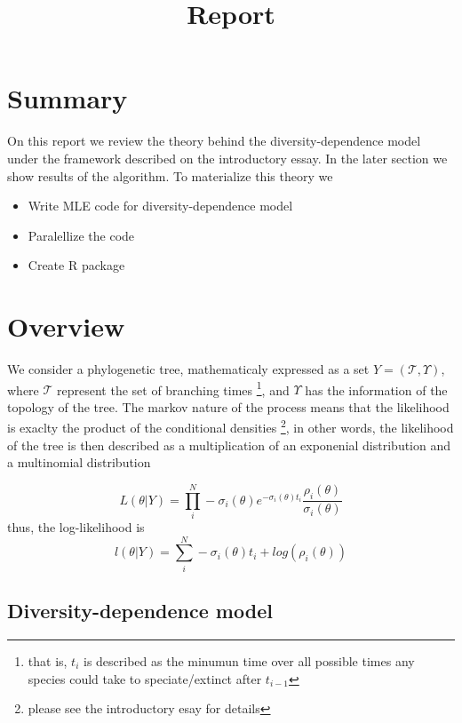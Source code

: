 \documentclass[]{article}
\title{Report}
\author{}
\let\rmarkdownfootnote\footnote%
\def\footnote{\protect\rmarkdownfootnote}
\begin{document}
\maketitle

\section*{Summary}

On this report we review the theory behind the diversity-dependence model under the framework described on the introductory essay. In the later section we show results of the algorithm. To materialize this theory we  

\begin{itemize}

	\item Write MLE code for diversity-dependence model
	\item Paralellize the code
	\item Create R package
	
\end{itemize}

\section*{Overview}

We consider a phylogenetic tree, mathematicaly expressed as a set $Y = (\mathcal{T},\Upsilon)$, where $\mathcal{T}$ represent the set of branching times \footnote{that is, $t_i$ is described as the minumun time over all possible times any species could take to speciate/extinct after $t_{i-1}$}, and $\Upsilon$ has the information of the topology of the tree. The markov nature of the process means that the likelihood is exaclty the product of the conditional densities \footnote{please see the introductory esay for details}, in other words, the likelihood of the tree is then described as a multiplication of an exponenial distribution and a multinomial distribution

$$ L(\theta | Y) = \displaystyle\prod_{i}^N -\sigma_i(\theta) e^{-\sigma_i(\theta) t_i} \frac{\rho_i(\theta)}{\sigma_i (\theta)} $$
thus, the log-likelihood is
$$ l(\theta | Y) = \displaystyle\sum_{i}^N -\sigma_i(\theta) t_i + log (\rho_i(\theta)) $$


\subsection*{Diversity-dependence model}
\end{document}
